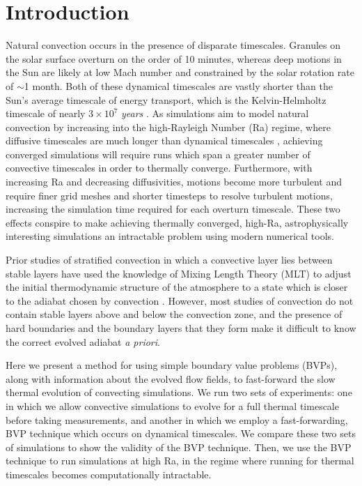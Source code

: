 \documentclass[aps, pre, onecolumn, nofootinbib, notitlepage, groupedaddress, amsfonts, amssymb, amsmath, longbibliography]{revtex4-1}
\begin{document}
\section{Introduction}
\label{sec:intro}
Natural convection occurs in the presence of disparate timescales. Granules on the
solar surface overturn on the order of 10 minutes, whereas deep motions in the Sun are likely at
low Mach number and constrained by the solar rotation rate of $\sim$1 month.  
Both of these dynamical timescales are vastly shorter than the Sun's average timescale of energy transport,
which is the Kelvin-Helmholtz timescale of nearly $3 \times 10^7$ \emph{years} \cite{stix2003}. 
As simulations aim to model natural convection
by increasing into the high-Rayleigh Number (Ra) regime, where diffusive timescales are much
longer than dynamical timescales \cite{Anders&Brown2017}, achieving converged simulations will 
require runs which span a greater number of convective timescales in order to thermally converge.
Furthermore, with increasing Ra and decreasing diffusivities, motions become more turbulent
and require finer grid meshes and shorter timesteps to resolve turbulent motions, increasing the simulation
time required for each overturn timescale.  
These two effects conspire to make achieving thermally converged, high-Ra, astrophysically interesting
simulations an intractable problem using modern numerical tools.

Prior studies of stratified convection in which a convective layer lies between stable layers
have used the knowledge of Mixing Length Theory (MLT) to adjust the initial thermodynamic structure of
the atmosphere to a state which is closer to the adiabat chosen by convection \cite{brandenburg&all2005}.
However, most studies of convection do not contain stable layers above and below the convection
zone, and the presence of hard boundaries and the boundary layers that they form make it difficult to
know the correct evolved adiabat \emph{a priori}.

Here we present a method for using simple boundary value problems (BVPs), 
along with information about the evolved flow fields,
to fast-forward the slow thermal evolution of convecting simulations.  
We run two sets of experiments: one in which we allow convective simulations to evolve for a
full thermal timescale before taking measurements, and another in which we employ a fast-forwarding,
BVP technique which occurs on dynamical timescales. We compare these two sets of simulations to
show the validity of the BVP technique.  Then, we use the BVP technique to run simulations
at high Ra, in the regime where running for thermal timescales becomes computationally intractable.
\end{document}
